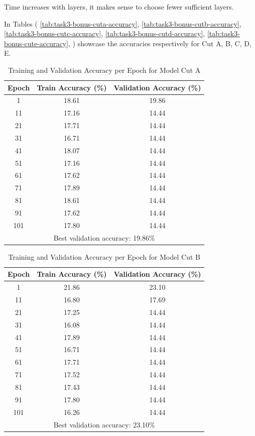 \documentclass[11pt]{scrartcl}
\begin{document}
Time increases with layers, it makes sense to choose fewer sufficient layers.

In Tables (
	\ref{tab:task3-bonus-cuta-accuracy},
	\ref{tab:task3-bonus-cutb-accuracy},
	\ref{tab:task3-bonus-cutc-accuracy},
	\ref{tab:task3-bonus-cutd-accuracy},
	\ref{tab:task3-bonus-cute-accuracy},
) showcase the accuracies respectively
for Cut A, B, C, D, E.

\begin{table}[htbp]
\centering
\caption{Training and Validation Accuracy per Epoch for Model Cut A}
\begin{tabular}{ccc}
\toprule
\textbf{Epoch} & \textbf{Train Accuracy (\%)} & \textbf{Validation Accuracy (\%)} \\
\midrule
1    & 18.61 & 19.86 \\
11   & 17.16 & 14.44 \\
21   & 17.71 & 14.44 \\
31   & 16.71 & 14.44 \\
41   & 18.07 & 14.44 \\
51   & 17.16 & 14.44 \\
61   & 17.62 & 14.44 \\
71   & 17.89 & 14.44 \\
81   & 18.61 & 14.44 \\
91   & 17.62 & 14.44 \\
101  & 17.80 & 14.44 \\
\midrule
\multicolumn{3}{c}{Best validation accuracy: 19.86\%} \\
\bottomrule
\end{tabular}
\label{tab:task3-model-cuta-accuracy}
\end{table}

\begin{table}[htbp]
\centering
\caption{Training and Validation Accuracy per Epoch for Model Cut B}
\begin{tabular}{ccc}
\toprule
\textbf{Epoch} & \textbf{Train Accuracy (\%)} & \textbf{Validation Accuracy (\%)} \\
\midrule
1    & 21.86 & 23.10 \\
11   & 16.80 & 17.69 \\
21   & 17.25 & 14.44 \\
31   & 16.08 & 14.44 \\
41   & 17.89 & 14.44 \\
51   & 16.71 & 14.44 \\
61   & 17.71 & 14.44 \\
71   & 17.52 & 14.44 \\
81   & 17.43 & 14.44 \\
91   & 17.80 & 14.44 \\
101  & 16.26 & 14.44 \\
\midrule
\multicolumn{3}{c}{Best validation accuracy: 23.10\%} \\
\bottomrule
\end{tabular}
\label{tab:task3-model-cutb-accuracy}
\end{table}
\end{document}
